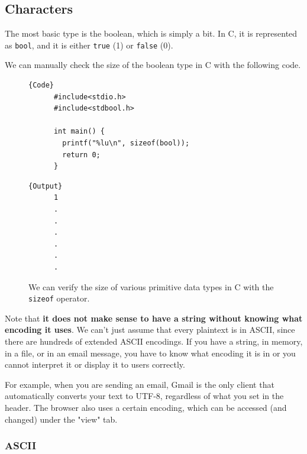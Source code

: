 \subsection{Characters}

  \begin{definition}[Booleans in C]
    The most basic type is the boolean, which is simply a bit. In C, it is represented as \texttt{bool}, and it is either \texttt{true} (1) or \texttt{false} (0). 
  \end{definition}

  We can manually check the size of the boolean type in C with the following code. 

  \begin{figure}[H]
    \centering 
    \noindent\begin{minipage}{.5\textwidth}
    \begin{lstlisting}[firstnumber=1]{Code}
      #include<stdio.h>
      #include<stdbool.h>

      int main() {
        printf("%lu\n", sizeof(bool)); 
        return 0; 
      }
    \end{lstlisting}
    \end{minipage}
    \hfill
    \begin{minipage}{.49\textwidth}
    \begin{lstlisting}[]{Output}
      1
      .
      .
      .
      .
      .
      .
    \end{lstlisting}
    \end{minipage}
    \caption{We can verify the size of various primitive data types in C with the \texttt{sizeof} operator.} 
    \label{fig:boolean_size}
  \end{figure}

  Note that \textbf{it does not make sense to have a string without knowing what encoding it uses}. We can't just assume that every plaintext is in ASCII, since there are hundreds of extended ASCII encodings. If you have a string, in memory, in a file, or in an email message, you have to know what encoding it is in or you cannot interpret it or display it to users correctly. 

  For example, when you are sending an email, Gmail is the only client that automatically converts your text to UTF-8, regardless of what you set in the header. The browser also uses a certain encoding, which can be accessed (and changed) under the "view" tab. 

  \subsubsection{ASCII}

